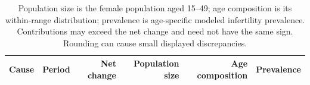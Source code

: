 \documentclass[11pt,a4paper]{article}
\begin{document}
\begin{table}[htbp]\centering\small
\caption{Shapley decomposition of changes in China's modeled prevalent cases, thousands.}\label{tab:decomp}
\setlength{\tabcolsep}{4pt}
\begin{tabular}{llrrrr}\toprule
Cause & Period & Net change & Population size & Age composition & Prevalence\\\midrule
\end{tabular}
\caption*{Population size is the female population aged 15--49; age composition is its within-range distribution; prevalence is age-specific modeled infertility prevalence. Contributions may exceed the net change and need not have the same sign. Rounding can cause small displayed discrepancies.}
\end{table}
\end{document}

